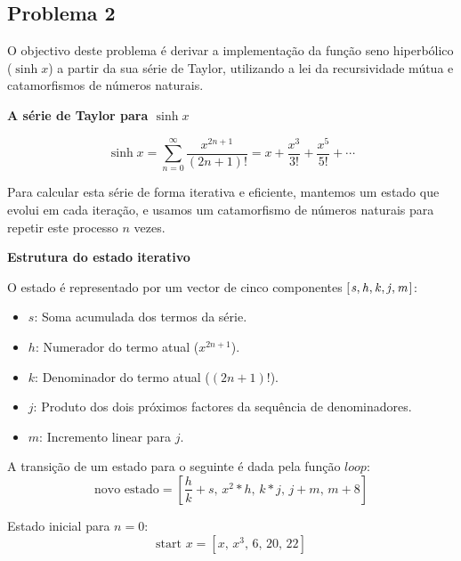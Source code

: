 \documentclass[11pt, a4paper, fleqn]{article}
\newcommand{\Varid}[1]{\mathit{#1}}
\begin{document}
\subsection*{Problema 2}

O objectivo deste problema é derivar a implementação da função seno hiperbólico ($\sinh x$)
a partir da sua série de Taylor, utilizando a lei da recursividade mútua e catamorfismos de números naturais.

\textbf{A série de Taylor para $\sinh x$}

\begin{displaymath}
\sinh x = \sum_{n=0}^{\infty} \frac{x^{2n+1}}{(2n+1)!} = x + \frac{x^3}{3!} + \frac{x^5}{5!} + \cdots
\end{displaymath}

Para calcular esta série de forma iterativa e eficiente, mantemos um estado que evolui em cada iteração,
e usamos um catamorfismo de números naturais para repetir este processo $n$ vezes.

\textbf{Estrutura do estado iterativo}

O estado é representado por um vector de cinco componentes \ensuremath{[\mskip1.5mu \Varid{s},\Varid{h},\Varid{k},\Varid{j},\Varid{m}\mskip1.5mu]}:
\begin{itemize}
    \item \ensuremath{\Varid{s}}: Soma acumulada dos termos da série.
    \item \ensuremath{\Varid{h}}: Numerador do termo atual ($x^{2n+1}$).
    \item \ensuremath{\Varid{k}}: Denominador do termo atual ($(2n+1)!$).
    \item \ensuremath{\Varid{j}}: Produto dos dois próximos factores da sequência de denominadores.
    \item \ensuremath{\Varid{m}}: Incremento linear para \ensuremath{\Varid{j}}.
\end{itemize}

A transição de um estado para o seguinte é dada pela função \ensuremath{\Varid{loop}}:
\begin{displaymath}
\text{novo estado} = \left[ \frac{h}{k} + s, \, x^2 * h, \, k * j, \, j + m, \, m + 8 \right]
\end{displaymath}

Estado inicial para $n = 0$:
\begin{displaymath}
\text{start } x = \left[ x, \, x^3, \, 6, \, 20, \, 22 \right]
\end{displaymath}
\end{document}
